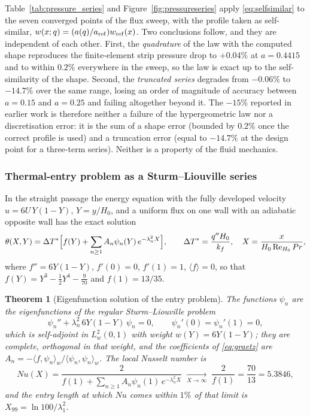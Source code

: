\documentclass[11pt,a4paper]{article}
\newtheorem{theorem}{Theorem}[section]
\newcommand{\tabinput}[1]{%
  \IfFileExists{tables/#1}{}{}}
\newcommand{\ReH}{\mathrm{Re}_{H_0}}
\begin{document}
Table~\ref{tab:pressure_series} and Figure~\ref{fig:pressureseries} apply
\eqref{eq:selfsimilar} to the seven converged points of the flux sweep, with the profile taken
as self-similar, $w(x;q)=(a(q)/a_{\rm ref})w_{\rm ref}(x)$. Two conclusions follow, and they are
independent of each other. First, the \emph{quadrature} of the law with the computed shape
reproduces the finite-element strip pressure drop to $+0.04\%$ at $a=0.4415$ and to within
$0.2\%$ everywhere in the sweep, so the law is exact up to the self-similarity of the shape.
Second, the \emph{truncated series} degrades from $-0.06\%$ to $-14.7\%$ over the same range,
losing an order of magnitude of accuracy between $a=0.15$ and $a=0.25$ and failing altogether
beyond it. The $-15\%$ reported in earlier work is therefore neither a failure of the
hypergeometric law nor a discretisation error: it is the sum of a shape error (bounded by
$0.2\%$ once the correct profile is used) and a truncation error (equal to $-14.7\%$ at the
design point for a three-term series). Neither is a property of the fluid mechanics.

\tabinput{table_pressure_series.tex}


\subsubsection{Thermal-entry problem as a Sturm--Liouville series}
\label{sec:thermalseries}

In the straight passage the energy equation with the fully developed velocity
$u=6U\,Y(1-Y)$, $Y=y/H_0$, and a uniform flux on one wall with an adiabatic opposite wall has
the exact solution
\begin{equation}
\theta(X,Y)=\Delta T^*\Bigl[f(Y)+\sum_{n\ge1}A_n\psi_n(Y)\,e^{-\lambda_n^2X}\Bigr],
\qquad \Delta T^*=\frac{q''H_0}{k_f},\quad X=\frac{x}{H_0\,\ReH\,Pr},
\label{eq:graetz}
\end{equation}
where $f''=6Y(1-Y)$, $f'(0)=0$, $f'(1)=1$, $\langle f\rangle=0$, so that
$f(Y)=Y^3-\tfrac12Y^4-\tfrac{9}{70}$ and $f(1)=13/35$.

\begin{theorem}[Eigenfunction solution of the entry problem]
\label{thm:graetz}
The functions $\psi_n$ are the eigenfunctions of the regular Sturm--Liouville problem
\begin{equation}
\psi_n''+\lambda_n^2\,6Y(1-Y)\,\psi_n=0,\qquad
\psi_n'(0)=\psi_n'(1)=0,
\label{eq:sl}
\end{equation}
which is self-adjoint in $L^2_w(0,1)$ with weight $w(Y)=6Y(1-Y)$; they are complete,
orthogonal in that weight, and the coefficients of \eqref{eq:graetz} are
$A_n=-\langle f,\psi_n\rangle_w/\langle\psi_n,\psi_n\rangle_w$. The local Nusselt number is
\begin{equation}
Nu(X)=\frac{2}{f(1)+\sum_{n\ge1}A_n\psi_n(1)\,e^{-\lambda_n^2X}}
\;\xrightarrow[X\to\infty]{}\;\frac{2}{f(1)}=\frac{70}{13}=5.3846 ,
\label{eq:Nuseries}
\end{equation}
and the entry length at which $Nu$ comes within $1\%$ of that limit is
$X_{99}=\ln100/\lambda_1^2$.
\end{theorem}
\end{document}
